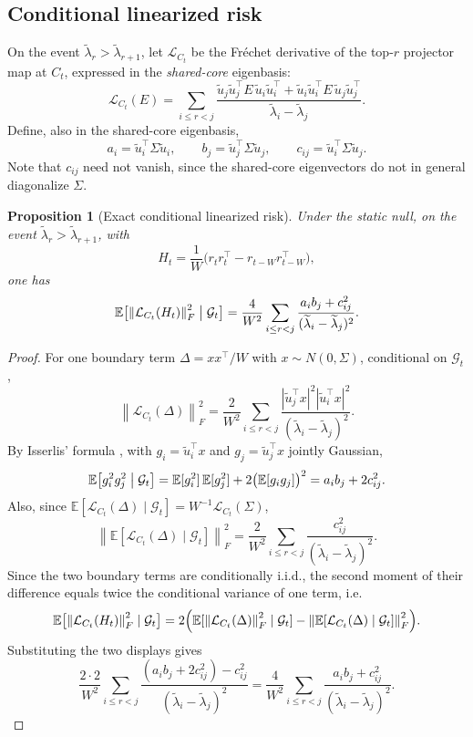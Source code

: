 \documentclass[11pt]{article}
\theoremstyle{tightplain}
\newtheorem{proposition}[theorem]{Proposition}
\theoremstyle{tightdef}
\newcommand{\E}{\mathbb E}
\newcommand{\norm}[1]{\left\lVert #1 \right\rVert}
\newcommand{\abs}[1]{\left\lvert #1 \right\rvert}
\begin{document}
\subsection{Conditional linearized risk}

On the event $\widetilde\lambda_r>\widetilde\lambda_{r+1}$, let
$\mathcal L_{C_t}$ be the Fr\'echet derivative of the top-$r$ projector map at
$C_t$, expressed in the \emph{shared-core} eigenbasis:
\[
\mathcal L_{C_t}(E)
=\sum_{i\le r<j}
\frac{
\widetilde u_j\widetilde u_j^\top E\,\widetilde u_i\widetilde u_i^\top
+
\widetilde u_i\widetilde u_i^\top E\,\widetilde u_j\widetilde u_j^\top
}
{\widetilde\lambda_i-\widetilde\lambda_j}.
\]
Define, also in the shared-core eigenbasis,
\[
a_i=\widetilde u_i^\top\Sigma\widetilde u_i,
\qquad
b_j=\widetilde u_j^\top\Sigma\widetilde u_j,
\qquad
c_{ij}=\widetilde u_i^\top\Sigma\widetilde u_j.
\]
Note that $c_{ij}$ need not vanish, since the shared-core eigenvectors do not in
general diagonalize $\Sigma$.

\begin{proposition}[Exact conditional linearized risk]\label{prop:conditionallinearized}
Under the static null, on the event
$\widetilde\lambda_r>\widetilde\lambda_{r+1}$, with
\[
H_t=\frac1W\bigl(r_t r_t^\top-r_{t-W}r_{t-W}^\top\bigr),
\]
one has
\[
\E\bigl[\norm{\mathcal L_{C_t}(H_t)}_F^2\bigm|\mathcal G_t\bigr]
=\frac4{W^2}
\sum_{i\le r<j}
\frac{a_i b_j+c_{ij}^2}{(\widetilde\lambda_i-\widetilde\lambda_j)^2}.
\]
\end{proposition}

\begin{proof}
For one boundary term $\Delta=xx^\top/W$ with $x\sim N(0,\Sigma)$, conditional
on $\mathcal G_t$,
\[
\norm{\mathcal L_{C_t}(\Delta)}_F^2
=\frac2{W^2}
\sum_{i\le r<j}
\frac{\abs{\widetilde u_j^\top x}^2\abs{\widetilde u_i^\top x}^2}
{(\widetilde\lambda_i-\widetilde\lambda_j)^2}.
\]
By Isserlis' formula \cite{Isserlis1918}, with $g_i=\widetilde u_i^\top x$ and
$g_j=\widetilde u_j^\top x$ jointly Gaussian,
\[
\E\bigl[g_i^2 g_j^2\bigm|\mathcal G_t\bigr]
=\E[g_i^2]\,\E[g_j^2]+2\bigl(\E[g_i g_j]\bigr)^2
=a_i b_j+2c_{ij}^2.
\]
Also, since $\E[\mathcal L_{C_t}(\Delta)\mid\mathcal G_t]=W^{-1}\mathcal L_{C_t}(\Sigma)$,
\[
\norm{\E[\mathcal L_{C_t}(\Delta)\mid\mathcal G_t]}_F^2
=\frac2{W^2}
\sum_{i\le r<j}
\frac{c_{ij}^2}{(\widetilde\lambda_i-\widetilde\lambda_j)^2}.
\]
Since the two boundary terms are conditionally i.i.d., the second moment of
their difference equals twice the conditional variance of one term, i.e.
\[
\E\bigl[\norm{\mathcal L_{C_t}(H_t)}_F^2\mid\mathcal G_t\bigr]
=2\Bigl(\E[\norm{\mathcal L_{C_t}(\Delta)}_F^2\mid\mathcal G_t]-\norm{\E[\mathcal L_{C_t}(\Delta)\mid\mathcal G_t]}_F^2\Bigr).
\]
Substituting the two displays gives
\[
\frac{2\cdot2}{W^2}\sum_{i\le r<j}\frac{(a_i b_j+2c_{ij}^2)-c_{ij}^2}{(\widetilde\lambda_i-\widetilde\lambda_j)^2}
=\frac4{W^2}\sum_{i\le r<j}\frac{a_i b_j+c_{ij}^2}{(\widetilde\lambda_i-\widetilde\lambda_j)^2}.
\]
\end{proof}
\end{document}
